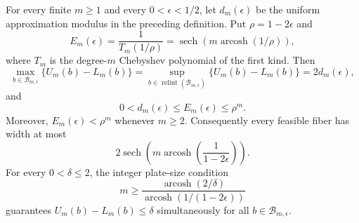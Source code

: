 For every finite \(m\geq1\) and every \(0<\epsilon<1/2\), let \(d_m(\epsilon)\) be the uniform approximation modulus in the preceding definition.  Put \(\rho=1-2\epsilon\) and
\[
 E_m(\epsilon)=\frac{1}{T_m(1/\rho)}
 =\operatorname{sech}\!\left(m\operatorname{arcosh}(1/\rho)\right),
\]
where \(T_m\) is the degree-\(m\) Chebyshev polynomial of the first kind.  Then
\[
 \max_{b\in\mathcal B_{m,\epsilon}}\{U_m(b)-L_m(b)\}
 =\sup_{b\in\operatorname{relint}(\mathcal B_{m,\epsilon})}\{U_m(b)-L_m(b)\}
 =2d_m(\epsilon),
\]
and
\[
 0<d_m(\epsilon)\leq E_m(\epsilon)\leq\rho^m.
\]
Moreover, \(E_m(\epsilon)<\rho^m\) whenever \(m\geq2\).  Consequently every feasible fiber has width at most
\[
 2\operatorname{sech}\!\left(m\operatorname{arcosh}\!\left(\frac{1}{1-2\epsilon}\right)\right).
\]
For every \(0<\delta\leq2\), the integer plate-size condition
\[
 m\geq
 \frac{\operatorname{arcosh}(2/\delta)}
 {\operatorname{arcosh}(1/(1-2\epsilon))}
\]
guarantees \(U_m(b)-L_m(b)\leq\delta\) simultaneously for all \(b\in\mathcal B_{m,\epsilon}\).